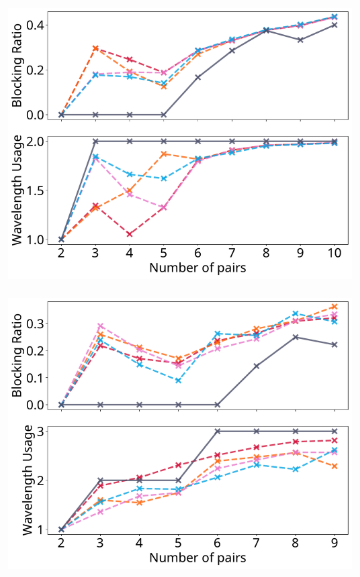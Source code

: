 \begin{figure}[H]
\centering
\begin{subfigure}{0.32\textwidth}
	\includegraphics[width=\textwidth]{pictures/plots/n_pairs/x-1-2-s.pdf}
\end{subfigure}
\begin{subfigure}{0.32\textwidth}
	\includegraphics[width=\textwidth]{pictures/plots/n_pairs/x-1-3-s.pdf}
\end{subfigure}
\begin{subfigure}{0.32\textwidth}

\end{subfigure}
\end{figure}
